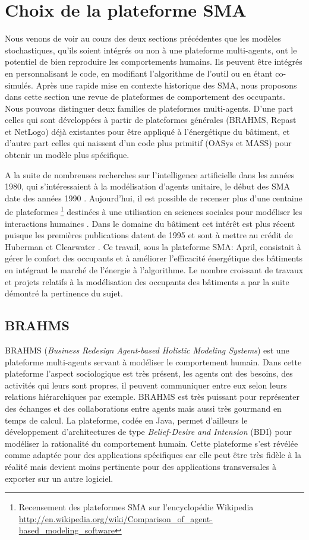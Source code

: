 \section{Choix de la plateforme SMA}

Nous venons de voir au cours des deux sections précédentes que les modèles stochastiques, qu'ils soient intégrés ou non à une plateforme multi-agents, ont le potentiel de bien reproduire les comportements humains. Ils peuvent être intégrés en personnalisant le code, en modifiant l'algorithme de l'outil ou en étant co-simulés. Après une rapide mise en contexte historique des SMA, nous proposons dans cette section une revue de plateformes de comportement des occupants. Nous pouvons distinguer deux familles de plateformes multi-agents. D'une part celles qui sont développées à partir de plateformes générales (BRAHMS, Repast et NetLogo) déjà existantes pour être appliqué à l'énergétique du bâtiment, et d'autre part celles qui naissent d'un code plus primitif (OASys et MASS) pour obtenir un modèle plus spécifique.

A la suite de nombreuses recherches sur l'intelligence artificielle dans les années 1980, qui s'intéressaient à la modélisation d'agents unitaire, le début des SMA date des années 1990 \cite{Alonso-14}. Aujourd'hui, il est possible de recenser plus d'une centaine de plateformes \footnote{Recensement des plateformes SMA sur l'encyclopédie Wikipedia \url{http://en.wikipedia.org/wiki/Comparison_of_agent-based_modeling_software}} destinées à une utilisation en sciences sociales pour modéliser les interactions humaines \cite{Bonabeau-02}. Dans le domaine du bâtiment cet intérêt est plus récent puisque les premières publications datent de 1995 et sont à mettre au crédit de Huberman et Clearwater \cite{Huberman-95}. Ce travail, sous la plateforme SMA: April, consistait à gérer le confort des occupants et à améliorer l'efficacité énergétique des bâtiments en intégrant le marché de l'énergie à l'algorithme. Le nombre croissant de travaux et projets relatifs à la modélisation des occupants des bâtiments a par la suite démontré la pertinence du sujet.

\subsection{BRAHMS}
\label{BRAHMS}

BRAHMS (\textit{Business Redesign Agent-based Holistic Modeling Systems}) est une plateforme multi-agents servant à modéliser le comportement humain. Dans cette plateforme l'aspect sociologique est très présent, les agents ont des besoins, des activités qui leurs sont propres, il peuvent communiquer entre eux selon leurs relations hiérarchiques par exemple. BRAHMS est très puissant pour représenter des échanges et des collaborations entre agents mais aussi très gourmand en temps de calcul. La plateforme, codée en Java, permet d'ailleurs le développement d'architectures de type \textit{Belief-Desire and Intension} (BDI) pour modéliser la rationalité du comportement humain. Cette plateforme s'est révélée comme adaptée pour des applications spécifiques car elle peut être très fidèle à la réalité mais devient moins pertinente pour des applications transversales à exporter sur un autre logiciel. 

